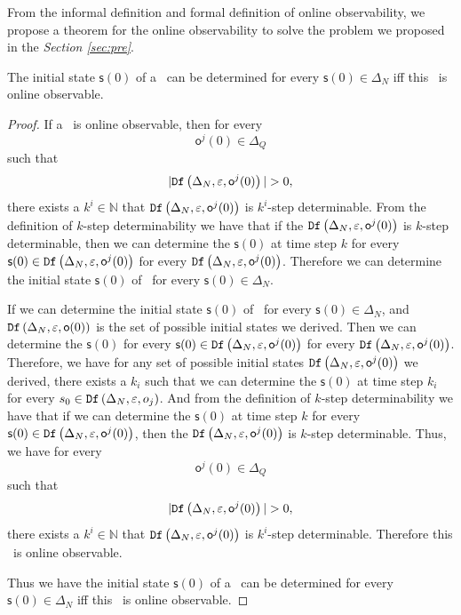 From the informal definition and formal definition of online observability, we propose a theorem for the online observability to solve the problem we proposed in the {\em Section \ref{sec:pre}}.
\begin{theorem}
The initial state $\mathsf{s}(0)$ of a \BCN\ can be determined for every $\mathsf{s}(0)\in \Delta_N$ iff this \BCN\ is online observable. 
\label{theo:1}
\end{theorem}
\begin{proof}
 If a \BCN\ is online observable,
then for every  \[\mathsf{o}^{j}(0)\in \Delta_Q\] such that \[|\Ded\left(\Delta_N,\varepsilon, \mathsf{o}^{j}(0)\right)|> 0,\] there exists a $k^{i}\in \mathbb{N}$ that ${\tt Df}\left(\Delta_N,\varepsilon,\mathsf{o}^{j}(0)\right)$ is $k^{i}$-step determinable. From the definition of $k$-step determinability we have that if the ${\tt Df}\left(\Delta_N,\varepsilon,\mathsf{o}^{j}(0)\right)$ is $k$-step determinable, then we can determine the $\mathsf{s}(0)$ at time step $k$ for every $\mathsf{s}(0) \in {\tt Df}\left(\Delta_N,\varepsilon,\mathsf{o}^{j}(0)\right)$ for every ${\tt Df}\left(\Delta_N,\varepsilon,\mathsf{o}^{j}(0)\right)$. Therefore we can determine the initial state $\mathsf{s}(0)$ of \BCNs\ for every $\mathsf{s}(0)\in \Delta_N$.

If we can determine the initial state $\mathsf{s}(0)$ of \BCNs\ for every $\mathsf{s}(0)\in \Delta_N$, and ${\tt Df}\left(\Delta_N,\varepsilon,\mathsf{o}(0)\right)$ is the set of possible initial states we derived. Then we can determine the $\mathsf{s}(0)$ for every $\mathsf{s}(0) \in {\tt Df}\left(\Delta_N,\varepsilon,\mathsf{o}^{j}(0)\right)$ for every ${\tt Df}\left(\Delta_N,\varepsilon,\mathsf{o}^{j}(0)\right)$. Therefore, we have for any set of possible initial states ${\tt Df}\left(\Delta_N,\varepsilon, \mathsf{o}^{j}(0)\right)$ we derived, there exists a $k_i$ such that we can determine the $\mathsf{s}(0)$ at time step $k_i$ for every $s_0\in {\tt Df}\left(\Delta_N,\varepsilon,o_j\right)$. And from the definition of $k$-step determinability we have that if we can determine the $\mathsf{s}(0)$ at time step $k$ for every $\mathsf{s}(0) \in {\tt Df}\left(\Delta_N,\varepsilon,\mathsf{o}^{j}(0)\right)$, then the ${\tt Df}\left(\Delta_N,\varepsilon,\mathsf{o}^{j}(0)\right)$ is $k$-step determinable.
 Thus, we have for every  \[\mathsf{o}^{j}(0)\in \Delta_Q\] such that \[|\Ded\left(\Delta_N,\varepsilon, \mathsf{o}^{j}(0)\right)|> 0,\] there exists a $k^{i}\in \mathbb{N}$ that ${\tt Df}\left(\Delta_N,\varepsilon,\mathsf{o}^{j}(0)\right)$ is $k^{i}$-step determinable. Therefore this \BCN\ is online observable.

Thus we have the initial state $\mathsf{s}(0)$ of a \BCN\ can be determined for every $\mathsf{s}(0)\in \Delta_N$ iff this \BCN\ is online observable. 
\end{proof}

